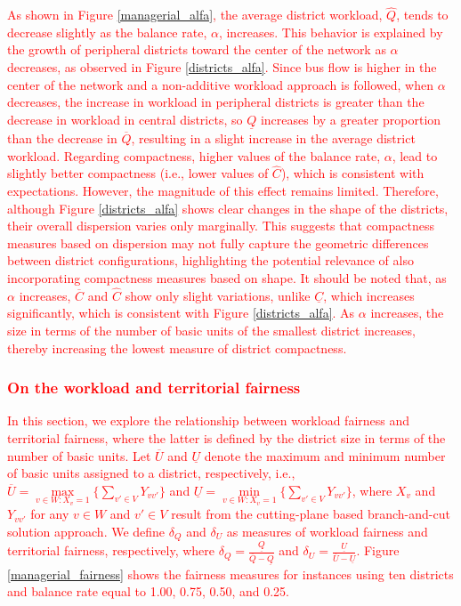 \documentclass[preprint,11pt]{elsarticle}
\begin{document}
\textcolor{red}{As shown in Figure \ref{managerial_alfa}, the average district workload, $\widehat{Q}$, tends to decrease slightly as the balance rate, $\alpha$, increases. 
This behavior is explained by the growth of peripheral districts toward the center of the network as $\alpha$ decreases, as observed in Figure \ref{districts_alfa}.
Since bus flow is higher in the center of the network and a non-additive workload approach is followed, when $\alpha$ decreases, the increase in workload in peripheral districts is greater than the decrease in workload in central districts, so $\underline{Q}$ increases by a greater proportion than the decrease in $\overline{Q}$, resulting in a slight increase in the average district workload.
Regarding compactness, higher values of the balance rate,  $\alpha$, lead to slightly better compactness (i.e., lower values of $\widehat{C}$), which is consistent with expectations. 
However, the magnitude of this effect remains limited. 
Therefore, although Figure \ref{districts_alfa} shows clear changes in the shape of the districts, their overall dispersion varies only marginally. 
This suggests that compactness measures based on dispersion may not fully capture the geometric differences between district configurations, highlighting the potential relevance of also incorporating compactness measures based on shape.
It should be noted that, as $\alpha$ increases, $\overline{C}$ and $\widehat{C}$ show only slight variations, unlike $\underline{C}$, which increases significantly, which is consistent with Figure \ref{districts_alfa}.
As $\alpha$ increases, the size in terms of the number of basic units of the smallest district increases, thereby increasing the lowest measure of district compactness.}

\subsubsection{\textcolor{red}{On the workload and territorial fairness}}

\textcolor{red}{In this section, we explore the relationship between workload fairness and territorial fairness, where the latter is defined by the district size in terms of the number of basic units.
Let $\overline{U}$ and $\underline{U}$ denote the maximum and minimum number of basic units assigned to a district, respectively, i.e., $\overline{U} = \max\limits_{v \in W: X_{v}=1} \{\sum_{v' \in V} Y_{vv'}\}$ and $\underline{U} = \min\limits_{v \in W: X_{v}=1} \{\sum_{v' \in V} Y_{vv'}\}$, where $X_v$ and $Y_{vv'}$ for any $v \in W$ and $v' \in V$ result from the cutting-plane based branch-and-cut solution approach. 
We define $\delta_{Q}$ and $\delta_{U}$ as measures of workload fairness and territorial fairness, respectively, where $\delta_{Q} = \frac{\underline{Q}}{\overline {Q} - \underline{Q}}$ and $\delta_{U} = \frac{\underline{U}}{\overline{U} - \underline{U}}$.
Figure \ref{managerial_fairness} shows the fairness measures for instances using ten districts and balance rate equal to 1.00, 0.75, 0.50, and 0.25.}
\end{document}
